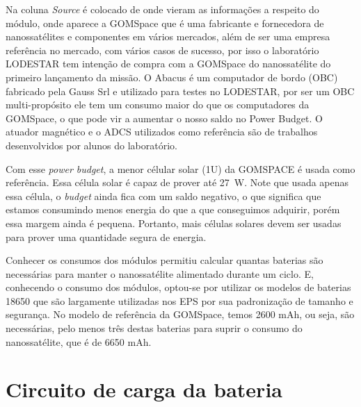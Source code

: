 Na coluna \textit{Source} é colocado de onde vieram as informações a respeito do módulo, onde aparece a GOMSpace que é uma fabricante e fornecedora de nanossatélites e componentes em vários mercados, além de ser uma empresa referência no mercado, com vários casos de sucesso, por isso o laboratório LODESTAR tem intenção de compra com a GOMSpace do nanossatélite do primeiro lançamento da missão. O Abacus é um computador de bordo (OBC) fabricado pela Gauss Srl e utilizado para testes no LODESTAR, por ser um OBC multi-propósito ele tem um consumo maior do que os computadores da GOMSpace, o que pode vir a aumentar o nosso saldo no Power Budget. O atuador magnético \cite{unb_mag_actuator} e o ADCS \cite{carol_adcs} utilizados como referência são de trabalhos desenvolvidos por alunos do laboratório. 


Com esse \textit{power budget}, a menor célular solar (1U) da GOMSPACE é usada como referência. Essa célula solar é capaz de prover até \SI{27}{\watt}. Note que usada apenas essa célula, o \textit{budget} ainda fica com um saldo negativo, o que significa que estamos consumindo menos energia do que a que conseguimos adquirir, porém essa margem ainda é pequena. Portanto, mais células solares devem ser usadas para prover uma quantidade segura de energia.

Conhecer os consumos dos módulos permitiu calcular quantas baterias são necessárias para manter o nanossatélite alimentado durante um ciclo. E, conhecendo o consumo dos módulos, optou-se por utilizar os modelos de baterias 18650 que são largamente utilizadas nos EPS por sua padronização de tamanho e segurança. No modelo de referência da GOMSpace, temos 2600 mAh, ou seja, são necessárias, pelo menos três destas baterias para suprir o consumo do nanossatélite, que é de 6650 mAh.


\section{Circuito de carga da bateria}

